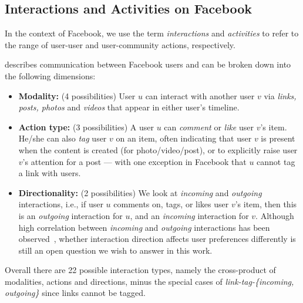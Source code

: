 \subsection{Interactions and Activities on Facebook}

In the context of Facebook, we use the term {\em interactions} and
{\em activities} to refer to the range of user-user and user-community
actions, respectively.

\vspace{3mm}

 describes communication between Facebook users
and can be broken down into the following dimensions:

\begin{itemize}

\item \textbf{Modality:} (4 possibilities) User $u$ can interact with
  another user $v$ via \textit{links, posts, photos} and
  \textit{videos} that appear in either user's timeline.

\item \textbf{Action type:} (3 possibilities) A user $u$ can
  \textit{comment} or \textit{like} user $v$'s item. He/she can also
  \textit{tag} user $v$ on an item, often indicating that user $v$ is
  present when the content is created (for photo/video/post), or to
  explicitly raise user $v$'s attention for a post --- with one
  exception in Facebook that $u$ cannot tag a link with users.

\item \textbf{Directionality:} (2 possibilities) We look at
  \textit{incoming} and \textit{outgoing} interactions, i.e., if user
  $u$ comments on, tags, or likes user $v$'s item, then this is an
  \textit{outgoing} interaction for $u$, and an \textit{incoming} 
  interaction for $v$.
  Although high correlation between \textit{incoming} and
  \textit{outgoing} interactions has been
  observed~\cite{saez2011high}, whether interaction direction affects
  user preferences differently is still an open question we wish to
  answer in this work.

\end{itemize}

Overall there are 22 possible interaction types, namely the cross-product of modalities, actions and directions, minus the special cases of {\em link-tag-\{incoming, outgoing\}} since links cannot be tagged.

\vspace{3mm}


